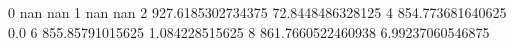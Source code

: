 0 nan nan
1 nan nan
2 927.6185302734375 72.8448486328125
4 854.773681640625 0.0
6 855.85791015625 1.084228515625
8 861.7660522460938 6.99237060546875
